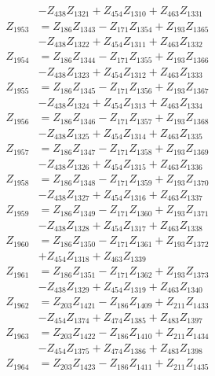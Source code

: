 \begin{multicols}{2}
\begin{align}
&- Z_{438}Z_{1321} + Z_{454}Z_{1310} + Z_{463}Z_{1331} \nonumber \\
Z_{1953} &= Z_{186}Z_{1343} - Z_{171}Z_{1354} + Z_{193}Z_{1365}  \nonumber \\
&- Z_{438}Z_{1322} + Z_{454}Z_{1311} + Z_{463}Z_{1332} \nonumber \\
Z_{1954} &= Z_{186}Z_{1344} - Z_{171}Z_{1355} + Z_{193}Z_{1366}  \nonumber \\
&- Z_{438}Z_{1323} + Z_{454}Z_{1312} + Z_{463}Z_{1333} \nonumber \\
Z_{1955} &= Z_{186}Z_{1345} - Z_{171}Z_{1356} + Z_{193}Z_{1367}  \nonumber \\
&- Z_{438}Z_{1324} + Z_{454}Z_{1313} + Z_{463}Z_{1334} \nonumber \\
Z_{1956} &= Z_{186}Z_{1346} - Z_{171}Z_{1357} + Z_{193}Z_{1368}  \nonumber \\
&- Z_{438}Z_{1325} + Z_{454}Z_{1314} + Z_{463}Z_{1335} \nonumber \\
Z_{1957} &= Z_{186}Z_{1347} - Z_{171}Z_{1358} + Z_{193}Z_{1369}  \nonumber \\
&- Z_{438}Z_{1326} + Z_{454}Z_{1315} + Z_{463}Z_{1336} \nonumber \\
Z_{1958} &= Z_{186}Z_{1348} - Z_{171}Z_{1359} + Z_{193}Z_{1370}  \nonumber \\
&- Z_{438}Z_{1327} + Z_{454}Z_{1316} + Z_{463}Z_{1337} \nonumber \\
Z_{1959} &= Z_{186}Z_{1349} - Z_{171}Z_{1360} + Z_{193}Z_{1371}  \nonumber \\
&- Z_{438}Z_{1328} + Z_{454}Z_{1317} + Z_{463}Z_{1338} \nonumber \\
Z_{1960} &= Z_{186}Z_{1350} - Z_{171}Z_{1361} + Z_{193}Z_{1372}  \nonumber \\
&+ Z_{454}Z_{1318} + Z_{463}Z_{1339} \nonumber \\
Z_{1961} &= Z_{186}Z_{1351} - Z_{171}Z_{1362} + Z_{193}Z_{1373}  \nonumber \\
&- Z_{438}Z_{1329} + Z_{454}Z_{1319} + Z_{463}Z_{1340} \nonumber \\
Z_{1962} &= Z_{203}Z_{1421} - Z_{186}Z_{1409} + Z_{211}Z_{1433}  \nonumber \\
&- Z_{454}Z_{1374} + Z_{474}Z_{1385} + Z_{483}Z_{1397} \nonumber \\
Z_{1963} &= Z_{203}Z_{1422} - Z_{186}Z_{1410} + Z_{211}Z_{1434}  \nonumber \\
&- Z_{454}Z_{1375} + Z_{474}Z_{1386} + Z_{483}Z_{1398} \nonumber \\
Z_{1964} &= Z_{203}Z_{1423} - Z_{186}Z_{1411} + Z_{211}Z_{1435}  \nonumber \\

\end{align}
\end{multicols}
